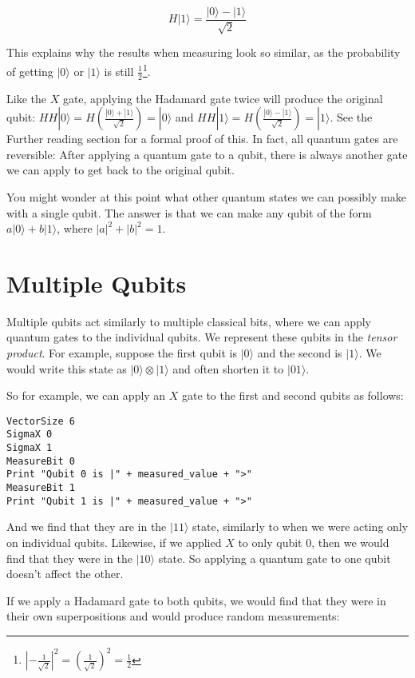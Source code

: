 \documentclass[twocolumn]{article}
\begin{document}
$$H|1\rangle = \frac{|0\rangle - |1\rangle}{\sqrt{2}}$$

This explains why the results when measuring look so similar, as the probability of getting $|0\rangle$ or $|1\rangle$ is still $\frac{1}{2}$\footnote{$|-\frac{1}{\sqrt{2}}|^2 = (\frac{1}{\sqrt{2}})^2 = \frac{1}{2}$}.

Like the $X$ gate, applying the Hadamard gate twice will produce the original qubit: $HH|0\rangle = H\left(\frac{|0\rangle + |1\rangle}{\sqrt{2}}\right) = |0\rangle$ and $HH|1\rangle = H\left(\frac{|0\rangle - |1\rangle}{\sqrt{2}}\right) = |1\rangle$. See the Further reading section for a formal proof of this. In fact, all quantum gates are reversible: After applying a quantum gate to a qubit, there is always another gate we can apply to get back to the original qubit.

You might wonder at this point what other quantum states we can possibly make with a single qubit. The answer is that we can make any qubit of the form $a|0\rangle + b|1\rangle$, where $|a|^2 + |b|^2 = 1$.

\section{Multiple Qubits}

Multiple qubits act similarly to multiple classical bits, where we can apply quantum gates to the individual qubits. We represent these qubits in the {\em tensor product}. For example, suppose the first qubit is $|0\rangle$ and the second is $|1\rangle$. We would write this state as $|0\rangle \otimes |1\rangle$ and often shorten it to $|01\rangle$.

So for example, we can apply an $X$ gate to the first and second qubits as follows:

\begin{lstlisting}
VectorSize 6
SigmaX 0
SigmaX 1
MeasureBit 0
Print "Qubit 0 is |" + measured_value + ">"
MeasureBit 1
Print "Qubit 1 is |" + measured_value + ">"
\end{lstlisting}

And we find that they are in the $|11\rangle$ state, similarly to when we were acting only on individual qubits. Likewise, if we applied $X$ to only qubit $0$, then we would find that they were in the $|10\rangle$ state. So applying a quantum gate to one qubit doesn't affect the other.

If we apply a Hadamard gate to both qubits, we would find that they were in their own superpositions and would produce random measurements:
\end{document}

